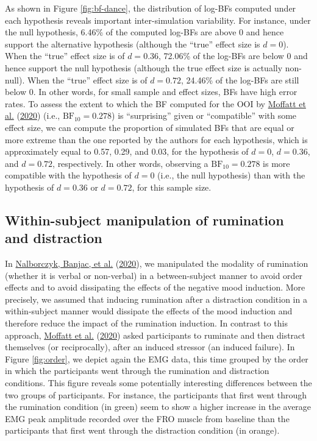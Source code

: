 \documentclass[
  english,
  man, donotrepeattitle,floatsintext]{apa6}
\begin{document}
As shown in Figure \ref{fig:bf-dance}, the distribution of log-BFs computed under each hypothesis reveals important inter-simulation variability. For instance, under the null hypothesis, 6.46\% of the computed log-BFs are above 0 and hence support the alternative hypothesis (although the ``true'' effect size is \(d = 0\)). When the ``true'' effect size is of \(d = 0.36\), 72.06\% of the log-BFs are below 0 and hence support the null hypothesis (although the true effect size is actually non-null). When the ``true'' effect size is of \(d = 0.72\), 24.46\% of the log-BFs are still below 0. In other words, for small sample and effect sizes, BFs have high error rates. To assess the extent to which the BF computed for the OOI by \protect\hyperlink{ref-moffatt_inner_2020}{Moffatt et al.} (\protect\hyperlink{ref-moffatt_inner_2020}{2020}) (i.e., \(\text{BF}_{10} = 0.278\)) is ``surprising'' given or ``compatible'' with some effect size, we can compute the proportion of simulated BFs that are equal or more extreme than the one reported by the authors for each hypothesis, which is approximately equal to 0.57, 0.29, and 0.03, for the hypothesis of \(d = 0\), \(d = 0.36\), and \(d = 0.72\), respectively. In other words, observing a \(\text{BF}_{10} = 0.278\) is more compatible with the hypothesis of \(d = 0\) (i.e., the null hypothesis) than with the hypothesis of \(d = 0.36\) or \(d = 0.72\), for this sample size.

\hypertarget{within-subject-manipulation-of-rumination-and-distraction}{%
\subsection{Within-subject manipulation of rumination and distraction}\label{within-subject-manipulation-of-rumination-and-distraction}}

In \protect\hyperlink{ref-nalborczyk_dissociating_2020}{Nalborczyk, Banjac, et al.} (\protect\hyperlink{ref-nalborczyk_dissociating_2020}{2020}), we manipulated the modality of rumination (whether it is verbal or non-verbal) in a between-subject manner to avoid order effects and to avoid dissipating the effects of the negative mood induction. More precisely, we assumed that inducing rumination after a distraction condition in a within-subject manner would dissipate the effects of the mood induction and therefore reduce the impact of the rumination induction. In contrast to this approach, \protect\hyperlink{ref-moffatt_inner_2020}{Moffatt et al.} (\protect\hyperlink{ref-moffatt_inner_2020}{2020}) asked participants to ruminate and then distract themselves (or reciprocally), after an induced stressor (an induced failure). In Figure \ref{fig:order}, we depict again the EMG data, this time grouped by the order in which the participants went through the rumination and distraction conditions. This figure reveals some potentially interesting differences between the two groups of participants. For instance, the participants that first went through the rumination condition (in green) seem to show a higher increase in the average EMG peak amplitude recorded over the FRO muscle from baseline than the participants that first went through the distraction condition (in orange).
\end{document}
